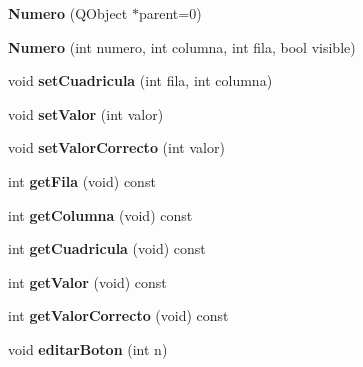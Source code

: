 \begin{DoxyCompactItemize}
\item 
\hypertarget{class_numero_a1393437877ace236d969c6dc44ae7ed4}{{\bfseries Numero} (Q\-Object $\ast$parent=0)}\label{class_numero_a1393437877ace236d969c6dc44ae7ed4}

\item 
\hypertarget{class_numero_a390143320c62c9ec5f89d767b8c2ef33}{{\bfseries Numero} (int numero, int columna, int fila, bool visible)}\label{class_numero_a390143320c62c9ec5f89d767b8c2ef33}

\item 
\hypertarget{class_numero_a582df3fe258d20235163d0fbcec712a8}{void {\bfseries set\-Cuadricula} (int fila, int columna)}\label{class_numero_a582df3fe258d20235163d0fbcec712a8}

\item 
\hypertarget{class_numero_a836200e8bd04882bc7ea2f5bc5d7beef}{void {\bfseries set\-Valor} (int valor)}\label{class_numero_a836200e8bd04882bc7ea2f5bc5d7beef}

\item 
\hypertarget{class_numero_ae9002d90ee6ccd3120077c304b85f4fd}{void {\bfseries set\-Valor\-Correcto} (int valor)}\label{class_numero_ae9002d90ee6ccd3120077c304b85f4fd}

\item 
\hypertarget{class_numero_a611e944da6a63813e305287c3f90ad76}{int {\bfseries get\-Fila} (void) const }\label{class_numero_a611e944da6a63813e305287c3f90ad76}

\item 
\hypertarget{class_numero_a4420f97d86be1c1a173405ea37423449}{int {\bfseries get\-Columna} (void) const }\label{class_numero_a4420f97d86be1c1a173405ea37423449}

\item 
\hypertarget{class_numero_ac80a32905356e20d893807572f8b8d4a}{int {\bfseries get\-Cuadricula} (void) const }\label{class_numero_ac80a32905356e20d893807572f8b8d4a}

\item 
\hypertarget{class_numero_ab744d258e626684a3106d39c9cf630b7}{int {\bfseries get\-Valor} (void) const }\label{class_numero_ab744d258e626684a3106d39c9cf630b7}

\item 
\hypertarget{class_numero_a850682763636579e94c90579f74d1308}{int {\bfseries get\-Valor\-Correcto} (void) const }\label{class_numero_a850682763636579e94c90579f74d1308}

\item 
\hypertarget{class_numero_a318e925fff822ed78cd39e382543620c}{void {\bfseries editar\-Boton} (int n)}\label{class_numero_a318e925fff822ed78cd39e382543620c}


\end{DoxyCompactItemize}

